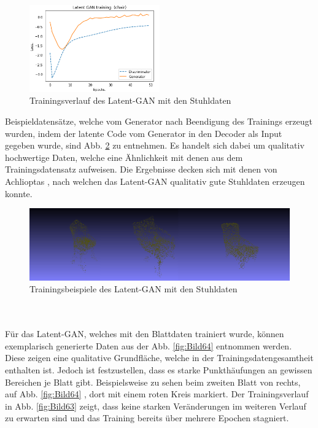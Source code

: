 \documentclass{llncs}
\begin{document}
\begin{figure}[htbp] 
	\centering
	\includegraphics[width=0.5\textwidth]{latent_gan_chair_result.png}
	\caption{Trainingsverlauf des Latent-GAN mit den Stuhldaten}
	\label{fig:Bild61}
\end{figure}
Beispieldatensätze, welche vom Generator nach Beendigung des Trainings erzeugt wurden, indem der latente Code vom Generator in den Decoder als Input gegeben wurde, sind Abb. \ref{fig:Bild62} zu entnehmen. Es handelt sich dabei um qualitativ hochwertige Daten, welche eine Ähnlichkeit mit denen aus dem Trainingsdatensatz aufweisen. Die Ergebnisse decken sich mit denen von Achlioptas \cite{3dgan}, nach welchen das Latent-GAN qualitativ gute Stuhldaten erzeugen konnte.  
\begin{figure}[htbp] 
	\centering
	\includegraphics[width=1.0\textwidth]{latent_gan_chair_example.png}
	\caption{Trainingsbeispiele des Latent-GAN mit den Stuhldaten}
	\label{fig:Bild62}
\end{figure}
~\\\\
Für das Latent-GAN, welches mit den Blattdaten trainiert wurde, können exemplarisch generierte Daten aus der Abb. \ref{fig:Bild64} entnommen werden. Diese zeigen eine qualitative Grundfläche, welche in der Trainingsdatengesamtheit enthalten ist. Jedoch ist festzustellen, dass es starke Punkthäufungen an gewissen Bereichen je Blatt gibt. Beispielsweise zu sehen beim zweiten Blatt von rechts, auf Abb. \ref{fig:Bild64} , dort mit einem roten Kreis markiert. Der Trainingsverlauf in Abb. \ref{fig:Bild63} zeigt, dass keine starken Veränderungen im weiteren Verlauf zu erwarten sind und das Training bereits über mehrere Epochen stagniert.
\end{document}
